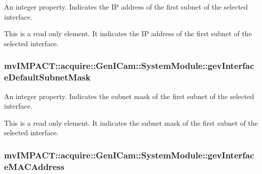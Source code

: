 An integer property. Indicates the I\+P address of the first subnet of the selected interface. 

This is a read only element. It indicates the I\+P address of the first subnet of the selected interface. \hypertarget{classmv_i_m_p_a_c_t_1_1acquire_1_1_gen_i_cam_1_1_system_module_a8b4fb4d0b42cb5cc8239fd17f8d84da4}{
\subsubsection[{gev\+Interface\+Default\+Subnet\+Mask}]{ mv\+I\+M\+P\+A\+C\+T\+::acquire\+::\+Gen\+I\+Cam\+::\+System\+Module\+::gev\+Interface\+Default\+Subnet\+Mask}}\label{classmv_i_m_p_a_c_t_1_1acquire_1_1_gen_i_cam_1_1_system_module_a8b4fb4d0b42cb5cc8239fd17f8d84da4}


An integer property. Indicates the subnet mask of the first subnet of the selected interface. 

This is a read only element. It indicates the subnet mask of the first subnet of the selected interface. \hypertarget{classmv_i_m_p_a_c_t_1_1acquire_1_1_gen_i_cam_1_1_system_module_aef65b56a13878a70a9bad2309fb749c0}{
\subsubsection[{gev\+Interface\+M\+A\+C\+Address}]{ mv\+I\+M\+P\+A\+C\+T\+::acquire\+::\+Gen\+I\+Cam\+::\+System\+Module\+::gev\+Interface\+M\+A\+C\+Address}}\label{classmv_i_m_p_a_c_t_1_1acquire_1_1_gen_i_cam_1_1_system_module_aef65b56a13878a70a9bad2309fb749c0}


